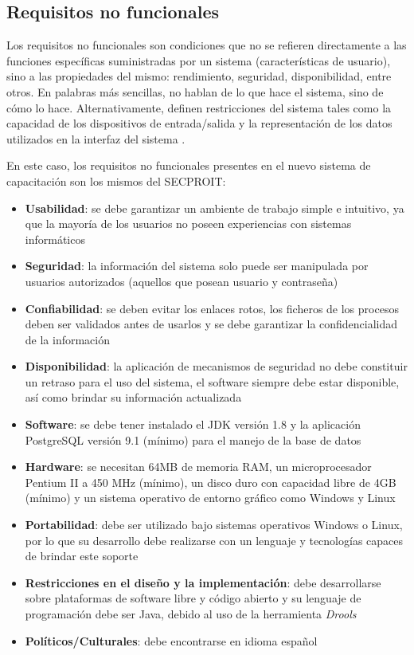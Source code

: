 \subsection{Requisitos no funcionales}
Los requisitos no funcionales son condiciones que no se refieren directamente a las funciones específicas suministradas por un sistema (características de usuario), sino a las propiedades del mismo: rendimiento, seguridad, disponibilidad, entre otros. En palabras más sencillas, no hablan de lo que hace el sistema, sino de cómo lo hace. Alternativamente, definen restricciones del sistema tales como la capacidad de los dispositivos de entrada/salida y la representación de los datos utilizados en la interfaz del sistema \cite{Dave2022}.

En este caso, los requisitos no funcionales presentes en el nuevo sistema de capacitación son los mismos del SECPROIT:

\begin{itemize}
\item \textbf{Usabilidad}: se debe garantizar un ambiente de trabajo simple e intuitivo, ya que la mayoría de los usuarios no poseen experiencias con sistemas informáticos
\item \textbf{Seguridad}: la información del sistema solo puede ser manipulada por usuarios autorizados (aquellos que posean usuario y contraseña)
\item \textbf{Confiabilidad}: se deben evitar los enlaces rotos, los ficheros de los procesos deben ser validados antes de usarlos y se debe garantizar la confidencialidad de la información
\item \textbf{Disponibilidad}: la aplicación de mecanismos de seguridad no debe constituir un retraso para el uso del sistema, el software siempre debe estar disponible, así como brindar su información actualizada
\item \textbf{Software}: se debe tener instalado el JDK versión 1.8 y la aplicación PostgreSQL versión 9.1 (mínimo) para el manejo de la base de datos
\item \textbf{Hardware}: se necesitan 64MB de memoria RAM, un microprocesador Pentium II a 450 MHz (mínimo), un disco duro con capacidad libre de 4GB (mínimo) y un sistema operativo de entorno gráfico como Windows y Linux
\item \textbf{Portabilidad}: debe ser utilizado bajo sistemas operativos Windows o Linux, por lo que su desarrollo debe realizarse con un lenguaje y tecnologías capaces de brindar este soporte
\item \textbf{Restricciones en el diseño y la implementación}: debe desarrollarse sobre plataformas de software libre y código abierto y su lenguaje de programación debe ser Java, debido al uso de la herramienta \textsl{Drools}
\item \textbf{Políticos/Culturales}: debe encontrarse en idioma español
\end{itemize}

